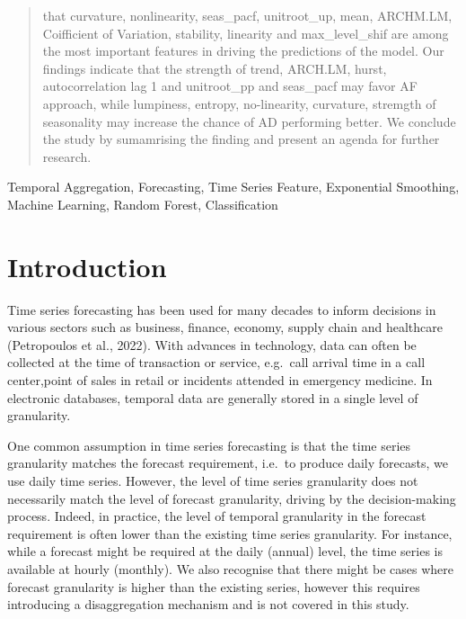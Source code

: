 \documentclass[]{elsarticle} %
\begin{document}
\begin{frontmatter}
\begin{abstract}
  that curvature, nonlinearity, seas\_pacf, unitroot\_up, mean,
  ARCHM.LM, Coifficient of Variation, stability, linearity and
  max\_level\_shif are among the most important features in driving the
  predictions of the model. Our findings indicate that the strength of
  trend, ARCH.LM, hurst, autocorrelation lag 1 and unitroot\_pp and
  seas\_pacf may favor AF approach, while lumpiness, entropy,
  no-linearity, curvature, stremgth of seasonality may increase the
  chance of AD performing better. We conclude the study by sumamrising
  the finding and present an agenda for further research.
  \end{abstract}
   \begin{keyword} Temporal Aggregation, Forecasting, Time Series
Feature, Exponential Smoothing, Machine Learning, Random Forest,
Classification\end{keyword}
 \end{frontmatter}

\hypertarget{introduction}{%
\section{Introduction}\label{introduction}}

Time series forecasting has been used for many decades to inform
decisions in various sectors such as business, finance, economy, supply
chain and healthcare (Petropoulos et al., 2022). With advances in
technology, data can often be collected at the time of transaction or
service, e.g.~call arrival time in a call center,point of sales in
retail or incidents attended in emergency medicine. In electronic
databases, temporal data are generally stored in a single level of
granularity.

One common assumption in time series forecasting is that the time series
granularity matches the forecast requirement, i.e.~to produce daily
forecasts, we use daily time series. However, the level of time series
granularity does not necessarily match the level of forecast
granularity, driving by the decision-making process. Indeed, in
practice, the level of temporal granularity in the forecast requirement
is often lower than the existing time series granularity. For instance,
while a forecast might be required at the daily (annual) level, the time
series is available at hourly (monthly). We also recognise that there
might be cases where forecast granularity is higher than the existing
series, however this requires introducing a disaggregation mechanism and
is not covered in this study.
\end{document}
